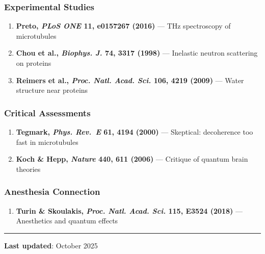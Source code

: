 \subsubsection{Experimental Studies}\label{experimental-studies}

\begin{enumerate}
\def\labelenumi{\arabic{enumi}.}
\setcounter{enumi}{3}
\tightlist
\item
  \textbf{Preto, \emph{PLoS ONE} 11, e0157267 (2016)} --- THz
  spectroscopy of microtubules
\item
  \textbf{Chou et al., \emph{Biophys. J.} 74, 3317 (1998)} ---
  Inelastic neutron scattering on proteins
\item
  \textbf{Reimers et al., \emph{Proc. Natl. Acad. Sci.} 106, 4219
  (2009)} --- Water structure near proteins
\end{enumerate}

\subsubsection{Critical Assessments}\label{critical-assessments}

\begin{enumerate}
\def\labelenumi{\arabic{enumi}.}
\setcounter{enumi}{6}
\tightlist
\item
  \textbf{Tegmark, \emph{Phys. Rev.~E} 61, 4194 (2000)} ---
  Skeptical: decoherence too fast in microtubules
\item
  \textbf{Koch \& Hepp, \emph{Nature} 440, 611 (2006)} --- Critique
  of quantum brain theories
\end{enumerate}

\subsubsection{Anesthesia Connection}\label{anesthesia-connection}

\begin{enumerate}
\def\labelenumi{\arabic{enumi}.}
\setcounter{enumi}{8}
\tightlist
\item
  \textbf{Turin \& Skoulakis, \emph{Proc. Natl. Acad. Sci.} 115, E3524
  (2018)} --- Anesthetics and quantum effects
\end{enumerate}

\begin{center}\rule{0.5\linewidth}{0.5pt}\end{center}

\textbf{Last updated}: October 2025
